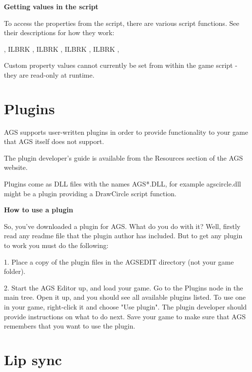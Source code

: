 \bf{Getting values in the script}

To access the properties from the script, there are various script functions. See
their descriptions for how they work:

,  ILBRK
,  ILBRK
,  ILBRK
,  ILBRK
, 

Custom property values cannot currently be set from within the game script - they are read-only
at runtime.

\section{Plugins}%

AGS supports user-written plugins in order to provide functionality to your game
that AGS itself does not support.

The plugin developer's guide is available from the Resources section of the AGS website.

Plugins come as DLL files with the names  AGS*.DLL, for example  agscircle.dll  might be a
plugin providing a DrawCircle script function.

\bf{How to use a plugin}

So, you've downloaded a plugin for AGS. What do you do with it?
Well, firstly read any readme file that the plugin author has included. But to get
any plugin to work you must do the following:

1. Place a copy of the plugin files in the AGSEDIT directory (not your game folder).

2. Start the AGS Editor up, and load your game. Go to the Plugins node in the main tree.
Open it up, and you should see all available plugins listed. To use one in your game,
right-click it and choose "Use plugin". The plugin developer should provide
instructions on what to do next. Save your game to make sure that AGS remembers
that you want to use the plugin.

\section{Lip sync}%

